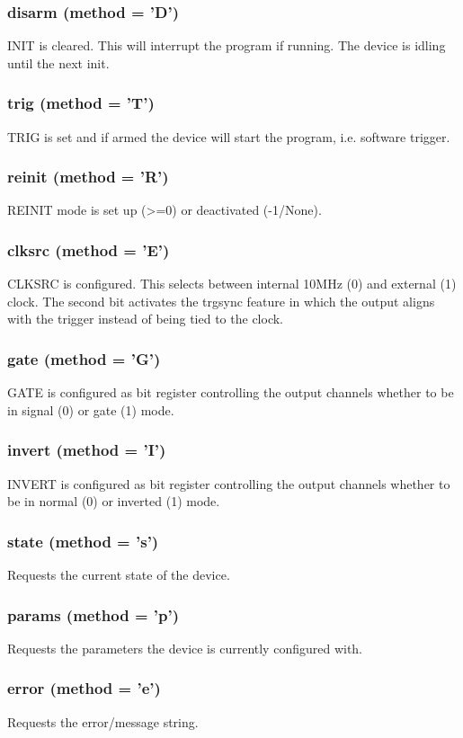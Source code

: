 \documentclass{article}
\begin{document}
\subsubsection*{disarm (method = 'D')}
INIT is cleared. This will interrupt the program if running. The device is idling until the next init.
\subsubsection*{trig (method = 'T')}
TRIG is set and if armed the device will start the program, i.e. software trigger.
\subsubsection*{reinit (method = 'R')}
REINIT mode is set up (>=0) or deactivated (-1/None).
\subsubsection*{clksrc (method = 'E')}
CLKSRC is configured. This selects between internal 10MHz (0) and external (1) clock.
The second bit activates the trgsync feature in which the output aligns with the trigger instead of being tied to the clock.
\subsubsection*{gate (method = 'G')}
GATE is configured as bit register controlling the output channels whether to be in signal (0) or gate (1) mode.
\subsubsection*{invert (method = 'I')}
INVERT is configured as bit register controlling the output channels whether to be in normal (0) or inverted (1) mode.
\subsubsection*{state (method = 's')}
Requests the current state of the device.
\subsubsection*{params (method = 'p')}
Requests the parameters the device is  currently configured with.
\subsubsection*{error (method = 'e')}
Requests the error/message string.
\end{document}
